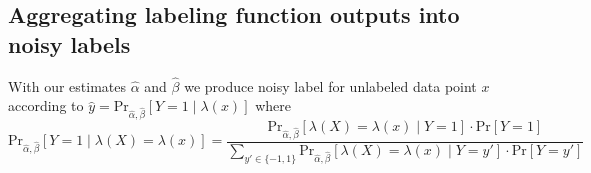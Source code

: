 \subsection{Aggregating labeling function outputs into noisy labels}

With our estimates $\hat{\alpha}$ and $\hat{\beta}$ we produce noisy label for unlabeled data point $x$ according to $\hat{y}=\text{Pr}_{\hat{\alpha},\hat{\beta}}[Y=1\mid\lambda(x)]$ where
\begin{equation}
    \text{Pr}_{\hat{\alpha},\hat{\beta}}[Y=1\mid\lambda(X)=\lambda(x)]=\frac{\text{Pr}_{\hat{\alpha},\hat{\beta}}[\lambda(X)=\lambda(x)\mid Y=1]\cdot\text{Pr}[Y=1]}{\sum_{y'\in\{-1,1\}}\text{Pr}_{\hat{\alpha},\hat{\beta}}[\lambda(X)=\lambda(x)\mid Y=y']\cdot\text{Pr}[Y=y']}
\end{equation}